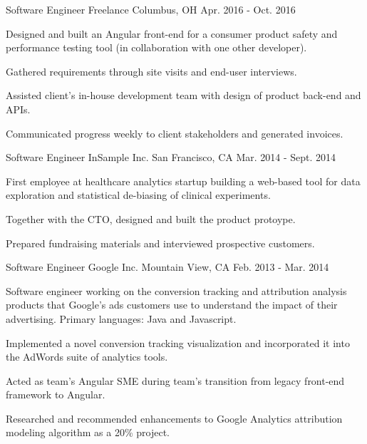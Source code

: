 \begin{cventries}
  \cventry
    {Software Engineer} %
    {Freelance} %
    {Columbus, OH} %
    {Apr. 2016 - Oct. 2016} %
    {
      \begin{cvitems} %
        \item {Designed and built an Angular front-end for a consumer product safety and performance testing tool (in collaboration with one other developer).}
        \item {Gathered requirements through site visits and end-user interviews.}
        \item {Assisted client's in-house development team with design of product back-end and APIs.}
        \item {Communicated progress weekly to client stakeholders and generated invoices.}
      \end{cvitems}
    }

  \cventry
    {Software Engineer} %
    {InSample Inc.} %
    {San Francisco, CA} %
    {Mar. 2014 - Sept. 2014} %
    {
      \begin{cvitems} %
        \item {First employee at healthcare analytics startup building a web-based tool for data exploration and statistical de-biasing of clinical experiments.}
        \item {Together with the CTO, designed and built the product protoype.}
        \item {Prepared fundraising materials and interviewed prospective customers.}
      \end{cvitems}
    }

  \cventry
    {Software Engineer} %
    {Google Inc.} %
    {Mountain View, CA} %
    {Feb. 2013 - Mar. 2014} %
    {
      \begin{cvitems} %
        \item {Software engineer working on the conversion tracking and attribution analysis products that Google’s ads customers use to understand the impact of their advertising. Primary languages: Java and Javascript.}
        \item {Implemented a novel conversion tracking visualization and incorporated it into the AdWords suite of analytics tools.}
        \item {Acted as team's Angular SME during team's transition from legacy front-end framework to Angular.}
        \item {Researched and recommended enhancements to Google Analytics attribution modeling algorithm as a 20\% project.}
      \end{cvitems}
    }


\end{cventries}

